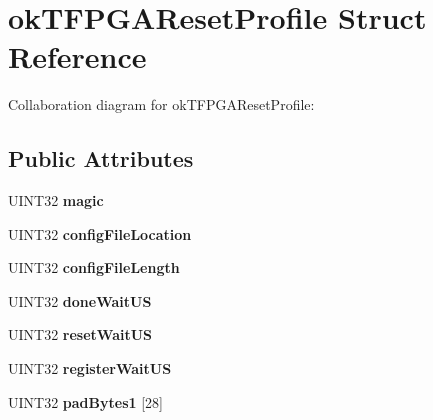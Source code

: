 \hypertarget{structokTFPGAResetProfile}{\section{ok\+T\+F\+P\+G\+A\+Reset\+Profile Struct Reference}
\label{structokTFPGAResetProfile}
}


Collaboration diagram for ok\+T\+F\+P\+G\+A\+Reset\+Profile\+:
\subsection*{Public Attributes}
\begin{DoxyCompactItemize}
\item 
\hypertarget{structokTFPGAResetProfile_a5424ad66ad734249bf2d9448da77b1e0}{U\+I\+N\+T32 {\bfseries magic}}\label{structokTFPGAResetProfile_a5424ad66ad734249bf2d9448da77b1e0}

\item 
\hypertarget{structokTFPGAResetProfile_af820d81f446e62e4cc548d0dd4925ebf}{U\+I\+N\+T32 {\bfseries config\+File\+Location}}\label{structokTFPGAResetProfile_af820d81f446e62e4cc548d0dd4925ebf}

\item 
\hypertarget{structokTFPGAResetProfile_abbca724159a519290ed930a4c900382e}{U\+I\+N\+T32 {\bfseries config\+File\+Length}}\label{structokTFPGAResetProfile_abbca724159a519290ed930a4c900382e}

\item 
\hypertarget{structokTFPGAResetProfile_a5a3dfd86f77e324d066371df4dc07a6e}{U\+I\+N\+T32 {\bfseries done\+Wait\+U\+S}}\label{structokTFPGAResetProfile_a5a3dfd86f77e324d066371df4dc07a6e}

\item 
\hypertarget{structokTFPGAResetProfile_ac62876565a1b5f32a9018ba4a8101ef2}{U\+I\+N\+T32 {\bfseries reset\+Wait\+U\+S}}\label{structokTFPGAResetProfile_ac62876565a1b5f32a9018ba4a8101ef2}

\item 
\hypertarget{structokTFPGAResetProfile_afc3073040946067b770baa8c3acc25dc}{U\+I\+N\+T32 {\bfseries register\+Wait\+U\+S}}\label{structokTFPGAResetProfile_afc3073040946067b770baa8c3acc25dc}

\item 
\hypertarget{structokTFPGAResetProfile_a15b049061c638be47e3c754a0468ea0e}{U\+I\+N\+T32 {\bfseries pad\+Bytes1} \mbox{[}28\mbox{]}}\label{structokTFPGAResetProfile_a15b049061c638be47e3c754a0468ea0e}


\end{DoxyCompactItemize}
